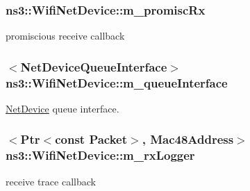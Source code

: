 \subsubsection[{\texorpdfstring{m\+\_\+promisc\+Rx}{m_promiscRx}}]{ ns3\+::\+Wifi\+Net\+Device\+::m\+\_\+promisc\+Rx\hspace{0.3cm}{\ttfamily [private]}}\hypertarget{classns3_1_1WifiNetDevice_a7e0b171d92c73b6d576ce1bfa0a115dd}{}\label{classns3_1_1WifiNetDevice_a7e0b171d92c73b6d576ce1bfa0a115dd}


promiscious receive callback 

\subsubsection[{\texorpdfstring{m\+\_\+queue\+Interface}{m_queueInterface}}]{$<${\bf Net\+Device\+Queue\+Interface}$>$ ns3\+::\+Wifi\+Net\+Device\+::m\+\_\+queue\+Interface\hspace{0.3cm}{\ttfamily [private]}}\hypertarget{classns3_1_1WifiNetDevice_a68bbd158f4112a8ea7edc759783cb333}{}\label{classns3_1_1WifiNetDevice_a68bbd158f4112a8ea7edc759783cb333}


\hyperlink{classns3_1_1NetDevice}{Net\+Device} queue interface. 

\subsubsection[{\texorpdfstring{m\+\_\+rx\+Logger}{m_rxLogger}}]{$<${\bf Ptr}$<$const {\bf Packet}$>$, {\bf Mac48\+Address}$>$ ns3\+::\+Wifi\+Net\+Device\+::m\+\_\+rx\+Logger\hspace{0.3cm}{\ttfamily [private]}}\hypertarget{classns3_1_1WifiNetDevice_adaab9495c7cc9ceb8d9fc60ddf5d2fbf}{}\label{classns3_1_1WifiNetDevice_adaab9495c7cc9ceb8d9fc60ddf5d2fbf}


receive trace callback 

